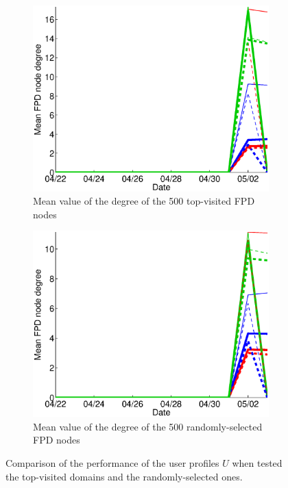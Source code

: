 \documentclass{sig-alternate}
\begin{document}
    \begin{figure}
   \centering

  \begin{subfigure}{.45\textwidth}
    \includegraphics[width=\textwidth]{figures/plots/top500-first-means.eps}
    \caption{Mean value of the degree of the 500 top-visited FPD nodes}
    \label{fig:top500_first_means}
  \end{subfigure}

  \begin{subfigure}{.45\textwidth}
    \includegraphics[width=\textwidth]{figures/plots/last500-first-means.eps}
    \caption{Mean value of the degree of the 500 randomly-selected FPD nodes}
    \label{fig:density_entities}
  \end{subfigure}
  \caption{Comparison of the performance of the user profiles $U$ when tested the top-visited domains and the randomly-selected ones.}
  \label{fig:top_last_domains_comparison}
  \end{figure}
\end{document}
